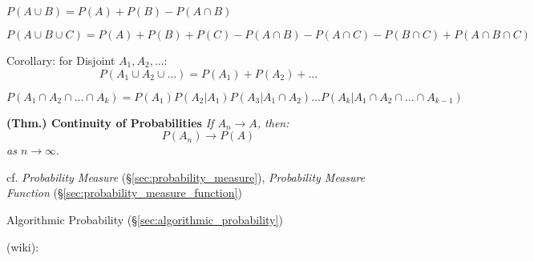 $P(A \cup B) = P(A) + P(B) - P(A \cap B)$

$P(A \cup B \cup C) = P(A) + P(B) + P(C) - P(A \cap B) - P(A \cap C) -
P(B \cap C) + P(A \cap B \cap C)$

Corollary: for Disjoint $A_1, A_2, \ldots$:
\[
  P(A_1 \cup A_2 \cup \ldots) = P(A_1) + P(A_2) + \ldots
\]

$P(A_1 \cap A_2 \cap \ldots \cap A_k) = P(A_1) P(A_2 | A_1) P(A_3 |
A_1 \cap A_2) \ldots P(A_k | A_1 \cap A_2 \cap \ldots \cap A_{k-1})$

\textbf{(Thm.) Continuity of Probabilities} \emph{If $A_n \to A$, then:}
\[
  P(A_n) \to P(A)
\]
\emph{as $n \to \infty$}.

cf. \emph{Probability Measure} (\S\ref{sec:probability_measure}),
\emph{Probability Measure Function} (\S\ref{sec:probability_measure_function})

\fist Algorithmic Probability (\S\ref{sec:algorithmic_probability})

(wiki):

